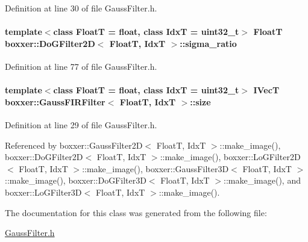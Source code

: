 Definition at line 30 of file Gauss\+Filter.\+h.

\paragraph[{\texorpdfstring{sigma\+\_\+ratio}{sigma_ratio}}]{\setlength{\rightskip}{0pt plus 5cm}template$<$class FloatT  = float, class IdxT  = uint32\+\_\+t$>$ FloatT {\bf boxxer\+::\+Do\+G\+Filter2D}$<$ FloatT, IdxT $>$\+::sigma\+\_\+ratio}\hypertarget{classboxxer_1_1DoGFilter2D_a68e3d95c06f7d41782be2d1a1db96ace}{}\label{classboxxer_1_1DoGFilter2D_a68e3d95c06f7d41782be2d1a1db96ace}


Definition at line 77 of file Gauss\+Filter.\+h.

\paragraph[{\texorpdfstring{size}{size}}]{\setlength{\rightskip}{0pt plus 5cm}template$<$class FloatT = float, class IdxT = uint32\+\_\+t$>$ {\bf I\+VecT} {\bf boxxer\+::\+Gauss\+F\+I\+R\+Filter}$<$ FloatT, IdxT $>$\+::size\hspace{0.3cm}{\ttfamily [inherited]}}\hypertarget{classboxxer_1_1GaussFIRFilter_ac0d4e19bb2be3e8913e77283e7e4317e}{}\label{classboxxer_1_1GaussFIRFilter_ac0d4e19bb2be3e8913e77283e7e4317e}


Definition at line 29 of file Gauss\+Filter.\+h.



Referenced by boxxer\+::\+Gauss\+Filter2\+D$<$ Float\+T, Idx\+T $>$\+::make\+\_\+image(), boxxer\+::\+Do\+G\+Filter2\+D$<$ Float\+T, Idx\+T $>$\+::make\+\_\+image(), boxxer\+::\+Lo\+G\+Filter2\+D$<$ Float\+T, Idx\+T $>$\+::make\+\_\+image(), boxxer\+::\+Gauss\+Filter3\+D$<$ Float\+T, Idx\+T $>$\+::make\+\_\+image(), boxxer\+::\+Do\+G\+Filter3\+D$<$ Float\+T, Idx\+T $>$\+::make\+\_\+image(), and boxxer\+::\+Lo\+G\+Filter3\+D$<$ Float\+T, Idx\+T $>$\+::make\+\_\+image().



The documentation for this class was generated from the following file\+:\begin{DoxyCompactItemize}
\item 
\hyperlink{GaussFilter_8h}{Gauss\+Filter.\+h}\end{DoxyCompactItemize}
